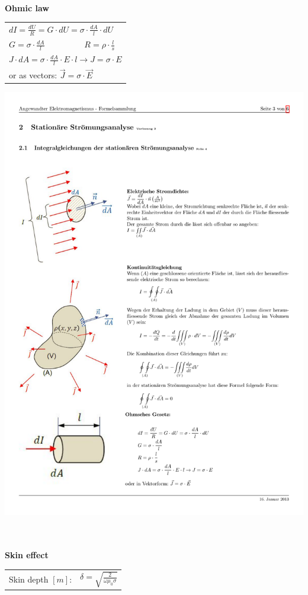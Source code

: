 \textbf{\\ Ohmic law\\}
\begin{minipage}[lt]{11cm}
	\begin{tabular}{l}
		\(\displaystyle dI = \frac{dU}{R} = G \cdot dU = \sigma \cdot \frac{dA}{l} \cdot dU \) \\
		\(\displaystyle G = \sigma \cdot \frac{dA}{l} \hspace{2cm} R = \rho \cdot \frac{l}{s} \) \\
		\(\displaystyle J \cdot dA = \sigma \cdot \frac{dA}{l} \cdot E \cdot l \rightarrow J = \sigma \cdot E \) \\
		or as vectors: \(\displaystyle \vec{J} = \sigma \cdot \vec{E}\)
	\end{tabular}
\end{minipage}
\begin{minipage}[rt]{8cm}
	\includegraphics[width=.5\textwidth]{./images/ohmic.pdf}
\end{minipage}

\textbf{\\ \\ Skin effect\\}
\begin{tabular}{ll}
	Skin depth $[m]$: & \(\displaystyle \delta = \sqrt{\frac{2}{\omega \mu_0\sigma}} \)
\end{tabular}

